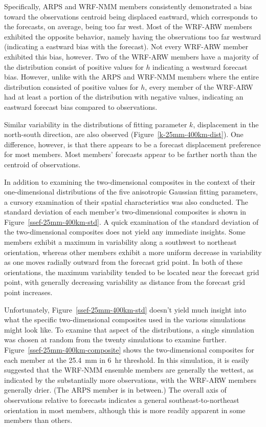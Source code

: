 Specifically, ARPS and WRF-NMM members consistently demonstrated a bias toward the observations centroid being displaced eastward, which corresponds to the forecasts, on average, being too far west.
Most of the WRF-ARW members exhibited the opposite behavior, namely having the observations too far westward (indicating a eastward bias with the forecast).
Not every WRF-ARW member exhibited this bias, however.
Two of the WRF-ARW members have a majority of the distribution consist of positive values for $h$ indicating a westward forecast bias.
However, unlike with the ARPS and WRF-NMM members where the entire distribution consisted of positive values for $h$, every member of the WRF-ARW had at least a portion of the distribution with negative values, indicating an eastward forecast bias compared to observations.


Similar variability in the distributions of fitting parameter $k$, displacement in the north-south direction, are also observed (\mbox{Figure \ref{k-25mm-400km-dist}}).
One difference, however, is that there appears to be a forecast displacement preference for most members.
Most members' forecasts appear to be farther north than the centroid of observations.


In addition to examining the two-dimensional composites in the context of their one-dimensional distributions of the five anisotropic Gaussian fitting parameters, a cursory examination of their spatial characteristics was also conducted.
The standard deviation of each member's two-dimensional composites is shown in \mbox{Figure \ref{ssef-25mm-400km-std}}.
A quick examination of the standard deviation of the two-dimensional composites does not yield any immediate insights.
Some members exhibit a maximum in variability along a southwest to northeast orientation, whereas other members exhibit a more uniform decrease in variability as one moves radially outward from the forecast grid point.
In both of these orientations, the maximum variability tended to be located near the forecast grid point, with generally decreasing variability as distance from the forecast grid point increases.


Unfortunately, \mbox{Figure \ref{ssef-25mm-400km-std}} doesn't yield much insight into what the specific two-dimensional composites used in the various simulations might look like.
To examine that aspect of the distributions, a single simulation was chosen at random from the twenty simulations to examine further.
\mbox{Figure \ref{ssef-25mm-400km-composite}} shows the two-dimensional composites for each member at the \mbox{25.4 mm} in \mbox{6 hr} threshold.
In this simulation, it is easily suggested that the WRF-NMM ensemble members are generally the wettest, as indicated by the substantially more observations, with the WRF-ARW members generally drier.
(The ARPS member is in between.)
The overall axis of observations relative to forecasts indicates a general southeast-to-northeast orientation in most members, although this is more readily apparent in some members than others.


